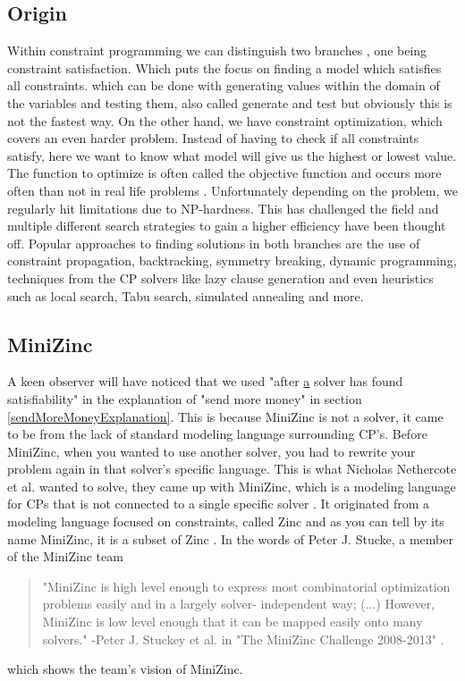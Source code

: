 \subsection{Origin}
Within constraint programming we can distinguish two branches \cite{52bartak1999constraint}, one being constraint satisfaction. Which puts the focus on finding a model which satisfies all constraints. which can be done with generating values within the domain of the variables and testing them, also called generate and test but obviously this is not the fastest way. 
On the other hand, we have constraint optimization, which covers an even harder problem. Instead of having to check if all constraints satisfy, here we want to know what model will give us the highest or lowest value. The function to optimize is often called the objective function and occurs more often than not in real life problems \cite{52bartak1999constraint}. 
Unfortunately depending on the problem, we regularly hit limitations due to NP-hardness. This has challenged the field and multiple different search strategies to gain a higher efficiency have been thought off. Popular approaches to finding solutions in both branches are the use of constraint propagation, backtracking, symmetry breaking, dynamic programming, techniques from the CP solvers like lazy clause generation and even heuristics such as local search, Tabu search, simulated annealing and more. 

\subsection{MiniZinc}
A keen observer will have noticed that we used "after \underline{a} solver has found satisfiability" in the explanation of "send more money" in section \ref{sendMoreMoneyExplanation}. 
This is because MiniZinc is not a solver, it came to be from the lack of standard modeling language surrounding CP's. Before MiniZinc, when you wanted to use another solver, you had to rewrite your problem again in that solver's specific language. This is what Nicholas Nethercote et al. wanted to solve, they came up with MiniZinc, which is a modeling language for CPs that is not connected to a single specific solver \cite{57nethercote2007minizinc}. It originated from a modeling language focused on constraints, called Zinc \cite{68incbanda2006modelling} and as you can tell by its name MiniZinc, it is a subset of Zinc \cite{57nethercote2007minizinc}.
In the words of Peter J. Stucke, a member of the MiniZinc team 

\begin{quote}
	"MiniZinc is high level enough to express most combinatorial optimization problems easily and in a largely solver-
	independent way; (...) However, MiniZinc is low level enough that it can be mapped easily onto many solvers." 
	\newline
	-Peter J. Stuckey et al. in "The MiniZinc Challenge 2008-2013" \cite{58stuckey2014minizinc}.
\end{quote} which shows the team's vision of MiniZinc.

